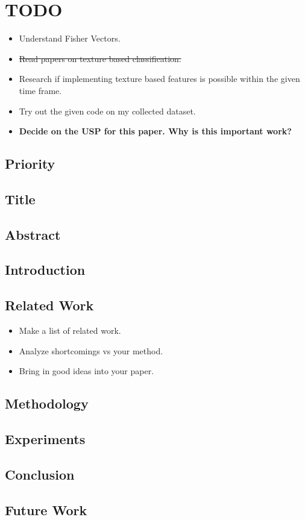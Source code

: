\section{TODO}\label{todo}

\begin{itemize}
\tightlist
\item
  Understand Fisher Vectors.
\item
  \sout{Read papers on texture based classification.}
\item
  Research if implementing texture based features is possible within the
  given time frame.
\item
  Try out the given code on my collected dataset.
\item
  \textbf{Decide on the USP for this paper. Why is this important work?}
\end{itemize}

\subsection{Priority}\label{priority}

\subsection{Title}\label{title}

\subsection{Abstract}\label{abstract}

\subsection{Introduction}\label{introduction}

\subsection{Related Work}\label{related-work}

\begin{itemize}
\tightlist
\item
  Make a list of related work.
\item
  Analyze shortcomings vs your method.
\item
  Bring in good ideas into your paper.
\end{itemize}

\subsection{Methodology}\label{methodology}

\subsection{Experiments}\label{experiments}

\subsection{Conclusion}\label{conclusion}

\subsection{Future Work}\label{future-work}
